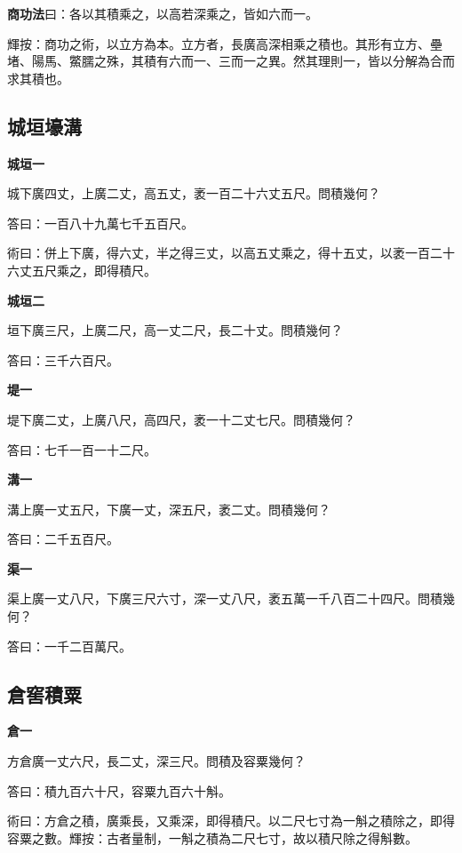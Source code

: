 \documentclass[11pt,a4paper]{article}
\newenvironment{problemenv}[1]{%
  \medskip\noindent\textbf{#1}\par\nopagebreak\smallskip
}{\medskip}
\begin{document}
\textbf{商功法}曰：各以其積乘之，以高若深乘之，皆如六而一。

輝按：商功之術，以立方為本。立方者，長廣高深相乘之積也。其形有立方、壘堵、陽馬、鱉臑之殊，其積有六而一、三而一之異。然其理則一，皆以分解為合而求其積也。

\subsection{城垣壕溝}

\begin{problemenv}{城垣一}
城下廣四丈，上廣二丈，高五丈，袤一百二十六丈五尺。問積幾何？

\textsf{答曰：}一百八十九萬七千五百尺。

\textsf{術曰：}併上下廣，得六丈，半之得三丈，以高五丈乘之，得十五丈，以袤一百二十六丈五尺乘之，即得積尺。
\end{problemenv}

\begin{problemenv}{城垣二}
垣下廣三尺，上廣二尺，高一丈二尺，長二十丈。問積幾何？

\textsf{答曰：}三千六百尺。
\end{problemenv}

\begin{problemenv}{堤一}
堤下廣二丈，上廣八尺，高四尺，袤一十二丈七尺。問積幾何？

\textsf{答曰：}七千一百一十二尺。
\end{problemenv}

\begin{problemenv}{溝一}
溝上廣一丈五尺，下廣一丈，深五尺，袤二丈。問積幾何？

\textsf{答曰：}二千五百尺。
\end{problemenv}

\begin{problemenv}{渠一}
渠上廣一丈八尺，下廣三尺六寸，深一丈八尺，袤五萬一千八百二十四尺。問積幾何？

\textsf{答曰：}一千二百萬尺。
\end{problemenv}

\subsection{倉窖積粟}

\begin{problemenv}{倉一}
方倉廣一丈六尺，長二丈，深三尺。問積及容粟幾何？

\textsf{答曰：}積九百六十尺，容粟九百六十斛。

\textsf{術曰：}方倉之積，廣乘長，又乘深，即得積尺。以二尺七寸為一斛之積除之，即得容粟之數。輝按：古者量制，一斛之積為二尺七寸，故以積尺除之得斛數。
\end{problemenv}
\end{document}
